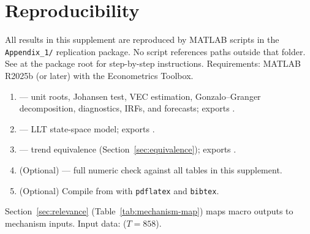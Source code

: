 \documentclass[12pt]{article}
\numberwithin{equation}{section}
\numberwithin{table}{section}
\theoremstyle{definition}
\begin{document}
\section{Reproducibility}
\label{sec:repro}

\begin{sloppypar}
All results in this supplement are reproduced by MATLAB scripts in the
\texttt{Appendix\_1/} replication package. No script references paths outside
that folder. See  at the package root for step-by-step
instructions. Requirements: MATLAB R2025b (or later) with the Econometrics
Toolbox.
\end{sloppypar}

\begin{enumerate}
\item {} --- unit roots, Johansen test, VEC
  estimation, Gonzalo--Granger decomposition, diagnostics, IRFs, and
  forecasts; exports .
\item {} --- LLT state-space model;
  exports .
\item {} --- trend
  equivalence (Section~\ref{sec:equivalence}); exports
  .
\item (Optional)  --- full
  numeric check against all tables in this supplement.
\item (Optional) Compile  from  with
  \texttt{pdflatex} and \texttt{bibtex}.
\end{enumerate}

\begin{sloppypar}
Section~\ref{sec:relevance} (Table~\ref{tab:mechanism-map}) maps macro outputs
to mechanism inputs. Input data:  ($T=858$).
\end{sloppypar}



\end{document}
